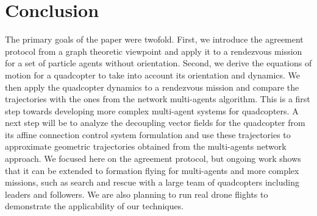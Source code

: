 \documentclass{aims}
\theoremstyle{definition}
\begin{document}
\begin{comment} 
For the agreement protocol:
\begin{equation}
    L=\left(\begin{array}{ccc}2&-1&-1\\-1&2&-1\\-1&-1&2\end{array}\right).
\end{equation}
In this scenario we assume a complete graph network so that all paths are linear.
In Fig. 9 we compare the trajectories seen in Fig. 10 for each of the coordinates of the motion for both the agreement protocol and the movement due to the realistic equations of motion.  The eigenvalues of $L$ are given by $\{0,3,3\}$.
\begin{figure}
\label{Chris/Trey}
\texttt{[image: TreyImages/Angles3dashed.jpg]}
\texttt{[image: TreyImages/Trajectory.jpg]}
\caption{The full trajectory}
\end{figure}
\end{comment}




\section{Conclusion}
The primary goals of the paper were twofold. First, we introduce the agreement protocol from a graph theoretic viewpoint and apply it to a rendezvous mission for a set of particle agents without orientation. Second, we derive the equations of motion for a quadcopter to take into account its orientation and dynamics. We then apply the quadcopter dynamics to a rendezvous mission and compare the trajectories with the ones from the network multi-agents algorithm. This is a first step towards developing more complex multi-agent systems for quadcopters. A next step will be to analyze the decoupling vector fields for the quadcopter from its affine connection control system formulation and use these trajectories to approximate geometric trajectories obtained from the multi-agents network approach. We focused here on the agreement protocol, but ongoing work shows that it can be extended to formation flying for multi-agents and more complex missions, such as search and rescue with a large team of quadcopters including leaders and followers. We are also planning to run real drone flights to demonstrate the applicability of our techniques. 

\end{document}
